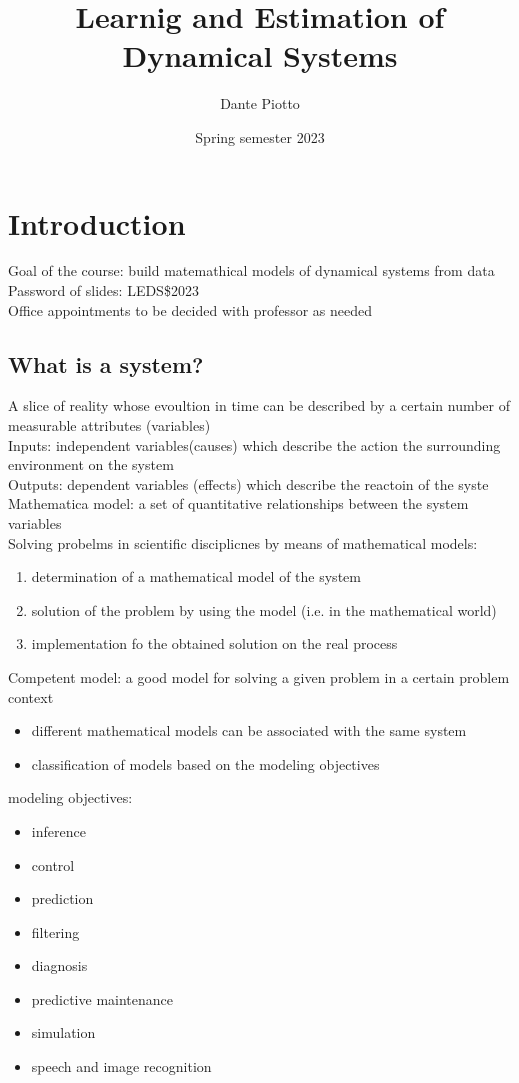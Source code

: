 \documentclass{book}
\title{Learnig and Estimation of Dynamical Systems}
\author{Dante Piotto}
\date{Spring semester 2023}
\begin{document}
\maketitle

\chapter{Introduction}
Goal of the course: build matemathical models of dynamical systems from data\\
Password of slides: LEDS\$2023\\
Office appointments to be decided with professor as needed\\
\section{What is a system?}
A slice of reality whose evoultion in time can be described by a certain number of measurable attributes (variables)\\
Inputs: independent variables(causes) which describe the action the surrounding environment on the system\\
Outputs: dependent variables (effects) which describe the reactoin of the syste\\
Mathematica model: a set of quantitative relationships between the system variables\\
Solving probelms in scientific disciplicnes by means of mathematical models:
\begin{enumerate}
    \item determination of a mathematical model of the system
    \item solution of the problem by using the model (i.e. in the mathematical world)
    \item implementation fo the obtained solution on the real process
\end{enumerate}
Competent model: a good model for solving a given problem in a certain problem context
\begin{itemize}
    \item different mathematical models can be associated with the same system
    \item classification of models based on  the modeling objectives
\end{itemize}
modeling objectives:
\begin{itemize}
    \item inference
    \item control
    \item prediction
    \item filtering
    \item diagnosis
    \item predictive maintenance
    \item simulation
    \item speech and image recognition
\end{itemize}
\end{document}
